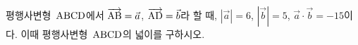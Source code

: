 평행사변형~$\mathrm{ABCD}$에서 $\overrightarrow{\mathrm{AB}}=\vec{a}$, $\overrightarrow{\mathrm{AD}}=\vec{b}$라 할 때, $|\vec{a}|=6$, $|\vec{b}|=5$, $\vec{a}\cdot\vec{b}=-15$이다. 이때 평행사변형~$\mathrm{ABCD}$의 넓이를 구하시오.
